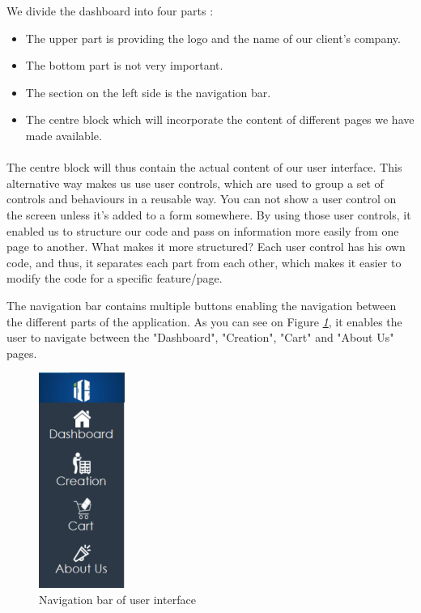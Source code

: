\documentclass[12pt,oneside]{report}
\begin{document}
        We divide the dashboard into four parts : 
        
        \begin{itemize}
            \item The upper part is providing the logo and the name of our client's company.
            \item The bottom part is not very important.
            \item The section on the left side is the navigation bar.
            \item The centre block which will incorporate the content of different pages we have made available.
        \end{itemize}
        
        \paragraph{}
        The centre block will thus contain the actual content of our user interface. This alternative way makes us use user controls, which are used to group a set of controls and behaviours in a reusable way. You can not show a user control on the screen unless it's added to a form somewhere. By using those user controls, it enabled us to structure our code and pass on information more easily from one page to another. What makes it more structured? Each user control has his own code, and thus, it separates each part from each other, which makes it easier to modify the code for a specific feature/page.
        
        \newpage
        The navigation bar contains multiple buttons enabling the navigation between the different parts of the application. As you can see on Figure \textit{\ref{fig:navigationBar}}, it enables the user to navigate between the "Dashboard", "Creation", "Cart" and "About Us" pages.
        
        \begin{figure}[h!]
            \centering
			\includegraphics[width = 0.25\textwidth]{Figures/navigationBar.PNG}
            \caption{Navigation bar of user interface}
            \label{fig:navigationBar}
        \end{figure}
        
\end{document}
